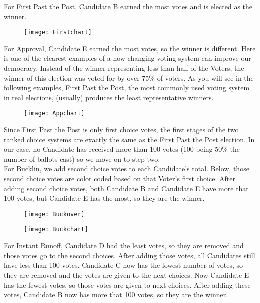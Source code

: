 \documentclass[12pt]{article}
\newcounter{step}
\begin{document}
For First Past the Post, Candidate B earned the most votes and is elected as the winner.

\begin{figure}[H]
\centering
\texttt{[image: Firstchart]}
\end{figure}

For Approval, Candidate E earned the most votes, so the winner is different. Here is one of the clearest examples of a how changing voting system can improve our democracy. Instead of the winner representing less than half of the Voters, the winner of this election was voted for by over 75\% of voters. As you will see in the following examples, First Past the Post, the most commonly used voting system in real elections, (usually) produces the least representative winners.

\begin{figure}[H]
\centering
\texttt{[image: Appchart]}
\end{figure}

\qquad Since First Past the Post is only first choice votes, the first stages of the two ranked choice systems are exactly the same as the First Past the Post election. In our case, no Candidate has received more than 100 votes (100 being 50\% the number of ballots cast) so we move on to step two.\\

For Bucklin, we add second choice votes to each Candidate's total. Below, those second choice votes are color coded based on that Voter's first choice. After adding second choice votes, both Candidate B and Candidate E have more that 100 votes, but Candidate E has the most, so they are the winner.

\begin{figure}[H]
\centering
\texttt{[image: Buckover]}
\end{figure}
\begin{figure}[H]
\centering
\texttt{[image: Buckchart]}
\end{figure}

For Instant Runoff, Candidate D had the least votes, so they are removed and those votes go to the second choices. After adding those votes, all Candidates still have less than 100 votes. Candidate C now has the lowest number of votes, so they are removed and the votes are given to the next choices. Now Candidate E has the fewest votes, so those votes are given to next choices. After adding these votes, Candidate B now has more that 100 votes, so they are the winner. 
\end{document}
